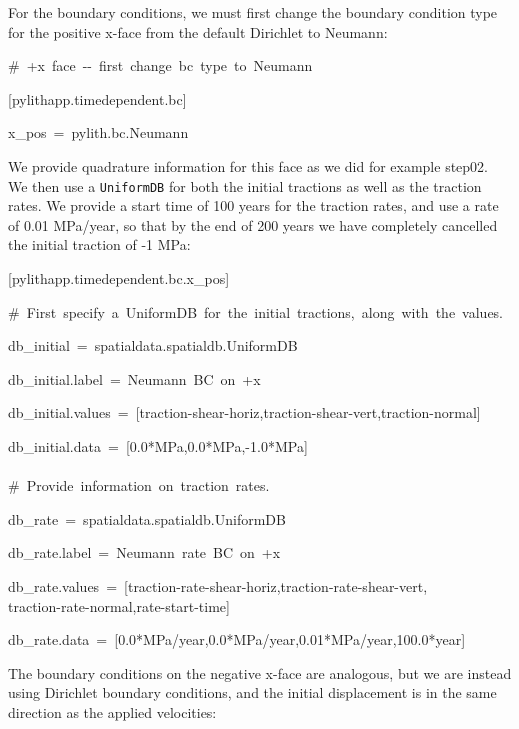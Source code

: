For the boundary conditions, we must first change the boundary condition
type for the positive x-face from the default Dirichlet to Neumann:
\begin{lyxcode}
\#~+x~face~-{}-~first~change~bc~type~to~Neumann

{[}pylithapp.timedependent.bc{]}

x\_pos~=~pylith.bc.Neumann~
\end{lyxcode}
We provide quadrature information for this face as we did for example
step02. We then use a \texttt{UniformDB} for both the initial tractions
as well as the traction rates. We provide a start time of 100 years
for the traction rates, and use a rate of 0.01 MPa/year, so that by
the end of 200 years we have completely cancelled the initial traction
of -1 MPa:
\begin{lyxcode}
{[}pylithapp.timedependent.bc.x\_pos{]}

\#~First~specify~a~UniformDB~for~the~initial~tractions,~along~with~the~values.

db\_initial~=~spatialdata.spatialdb.UniformDB

db\_initial.label~=~Neumann~BC~on~+x

db\_initial.values~=~{[}traction-shear-horiz,traction-shear-vert,traction-normal{]}

db\_initial.data~=~{[}0.0{*}MPa,0.0{*}MPa,-1.0{*}MPa{]}~\\
~\\


\#~Provide~information~on~traction~rates.

db\_rate~=~spatialdata.spatialdb.UniformDB

db\_rate.label~=~Neumann~rate~BC~on~+x

db\_rate.values~=~{[}traction-rate-shear-horiz,traction-rate-shear-vert,~\\
traction-rate-normal,rate-start-time{]}

db\_rate.data~=~{[}0.0{*}MPa/year,0.0{*}MPa/year,0.01{*}MPa/year,100.0{*}year{]}
\end{lyxcode}
The boundary conditions on the negative x-face are analogous, but
we are instead using Dirichlet boundary conditions, and the initial
displacement is in the same direction as the applied velocities:
